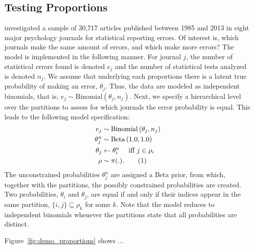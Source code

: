 \documentclass[11pt,a4paper]{article}
\theoremstyle{definition} %
\theoremstyle{case}
\newcommand{\numberthis}{\addtocounter{equation}{1}\tag{\theequation}}
\begin{document}
\subsection{Testing Proportions}
\textcite{nuijten2016prevalence} investigated a sample of 30,717 articles published between 1985 and 2013 in eight major psychology journals for statistical reporting errors. Of interest is, which journals make the same amount of errors, and which make more errors? The model is implemented in the following manner. For journal $j$, the number of statistical errors found is denoted $e_j$ and the number of statistical tests analyzed is denoted $n_j$. We assume that underlying each proportions there is a latent true probability of making an error, $\theta_j$. Thus, the data are modeled as independent binomials, that is, $e_j \sim \mathrm{Binomial}\left(\theta_j, n_j\right)$. Next, we specify a hierarchical level over the partitions to assess for which journals the error probability is equal. This leads to the following model specification:
\begin{align*}
    e_j                 &\sim \mathrm{Binomial}\left(\theta_j, n_j\right)\\
    \theta^u_j          &\sim \mathrm{Beta}\left(1.0, 1.0\right)\\
    \theta_j            &\leftarrow \theta^u_i \quad\text{ iff } j \in \rho_i\\
    \rho                &\sim \pi(.).\numberthis
\end{align*}
The unconstrained probabilities $\theta^u_j$ are assigned a Beta prior, from which, together with the partitions, the possibly constrained probabilities are created. Two probabilities, $\theta_i$ and $\theta_j$, are equal if and only if their indices appear in the same partition, $\{i, j\} \subseteq \rho_k$ for some $k$. Note that the model reduces to independent binomials whenever the partitions state that all probabilities are distinct.

Figure~\ref{fig:demo_proportions} shows ...
\end{document}
